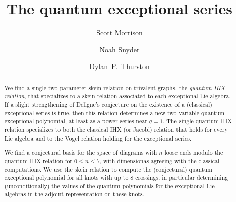 \documentclass[12pt]{amsart}
\begin{document}
\title{The quantum exceptional series}

\author[Morrison]{Scott Morrison}
\address{Canberra, Australia}

\author[Snyder]{Noah Snyder}
\address{Bloomington, Indiana, USA}

\author[Thurston]{Dylan~P.~Thurston}
\address{Bloomington, Indiana, USA}

\begin{abstract}
  We find a single two-parameter skein relation on trivalent graphs,
  the \emph{quantum IHX relation}, that specializes to a skein
  relation associated to each exceptional Lie algebra. If a slight
  strengthening of Deligne's conjecture on the existence of a
  (classical) exceptional series is true, then this relation
  determines a new two-variable quantum exceptional polynomial, at
  least as a power series near $q=1$. The
  single quantum IHX relation specializes to both the classical IHX
  (or Jacobi) relation that holds for every Lie algebra and to the
  Vogel relation holding for the exceptional series.

  We find a conjectural basis for the space of diagrams with $n$ loose
  ends modulo the quantum IHX relation for $0 \le n \le 7$, with
  dimensionas agreeing with the classical computations. We use the
  skein relation to compute the (conjectural) quantum exceptional
  polynomial for all knots with up to $8$ crossings, in particular
  determining (unconditionally) the values of the quantum polynomials
  for the exceptional Lie algebras in the adjoint representation on
  these knots.
\end{abstract}


\maketitle

\tableofcontents



\end{document}
